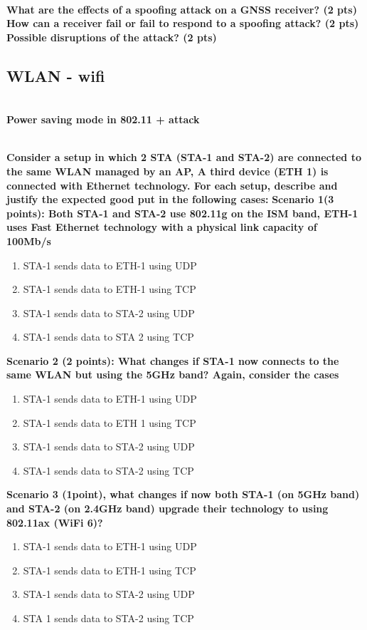 \textbf{\\What are the effects of a spoofing attack on a GNSS receiver? (2 pts) How can a receiver fail or fail to respond to a spoofing attack? (2 pts) Possible disruptions of the attack? (2 pts)}


\subsection{WLAN - wifi}




\textbf{\\Power saving mode in 802.11 + attack}

\textbf{\\ Consider a setup in which 2 STA (STA-1 and STA-2) are connected to the same WLAN managed by an AP, A third device (ETH 1) is connected with Ethernet technology. For each setup, describe and justify the expected good put in the following cases:}
\textbf{Scenario 1(3 points): Both STA-1 and STA-2 use 802.11g on the ISM band, ETH-1 uses Fast Ethernet technology with a physical link capacity of 100Mb/s}
\begin{enumerate}
    \item STA-1 sends data to ETH-1 using UDP
    \item STA-1 sends data to ETH-1 using TCP
    \item STA-1 sends data to STA-2 using UDP
    \item STA-1 sends data to STA 2 using TCP
\end{enumerate}
\textbf{Scenario 2 (2 points): What changes if STA-1 now connects to the same WLAN but using the 5GHz band? Again, consider the cases}
\begin{enumerate}
    \item STA-1 sends data to ETH-1 using UDP
    \item STA-1 sends data to ETH 1 using TCP
    \item STA-1 sends data to STA-2 using UDP
    \item STA-1 sends data to STA-2 using TCP
\end{enumerate}
\textbf{Scenario 3 (1point), what changes if now both STA-1 (on 5GHz band) and STA-2 (on 2.4GHz band) upgrade their technology to using 802.11ax (WiFi 6)?}
\begin{enumerate}
    \item STA-1 sends data to ETH-1 using UDP
    \item STA-1 sends data to ETH-1 using TCP
    \item STA-1 sends data to STA-2 using UDP
    \item STA 1 sends data to STA-2 using TCP
\end{enumerate}


